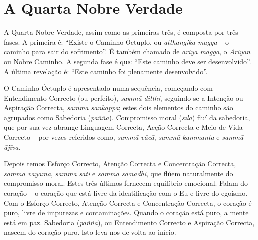 
\chapter{A Quarta Nobre Verdade}


A Quarta Nobre Verdade, assim como as primeiras três, é composta por três fases.
A primeira é: “Existe o Caminho Óctuplo, ou \emph{atthangika magga} – o caminho
para sair do sofrimento”. É também chamado de \emph{ariya magga}, o
\emph{Ariyan} ou Nobre Caminho. A segunda fase é que: “Este caminho deve ser
desenvolvido”. A última revelação é: “Este caminho foi plenamente desenvolvido”.

O Caminho Óctuplo é apresentado numa sequência, começando com Entendimento
Correcto (ou perfeito), \emph{sammā ditthi}, seguindo-se a Intenção ou Aspiração
Correcta, \emph{sammā sankappa}; estes dois elementos do caminho são agrupados
como Sabedoria (\emph{paññā}). Compromisso moral (\emph{sīla}) fluí da
sabedoria, que por sua vez abrange Linguagem Correcta, Acção Correcta e Meio de
Vida Correcto – por vezes referidos como, \emph{sammā vācā}, \emph{sammā
  kammanta} e \emph{sammā ājīva}.

Depois temos Esforço Correcto, Atenção Correcta e Concentração Correcta,
\emph{sammā vāyāma}, \emph{sammā sati} e \emph{sammā samādhi}, que flúem
naturalmente do compromisso moral. Estes três últimos fornecem equilíbrio
emocional. Falam do coração – o coração que está livre da identificação com o Eu
e livre do egoísmo. Com o Esforço Correcto, Atenção Correcta e Concentração
Correcta, o coração é puro, livre de impurezas e contaminações. Quando o coração
está puro, a mente está em paz. Sabedoria (\emph{paññā}), ou Entendimento
Correcto e Aspiração Correcta, nascem do coração puro. Isto leva-nos de volta ao
início.

